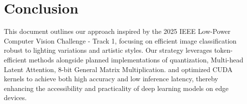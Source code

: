 \documentclass[11pt, oneside]{article}   	%
\begin{document}


\section*{Conclusion}

This document outlines our approach inspired by the 2025 IEEE Low-Power Computer Vision Challenge - Track 1, focusing on efficient image classification robust to lighting variations and artistic styles. Our strategy leverages token-efficient methods alongside planned implementations of quantization, Multi-head Latent Attention, 8-bit General Matrix Multiplication. and optimized CUDA kernels to achieve both high accuracy and low inference latency, thereby enhancing the accessibility and practicality of deep learning models on edge devices.




\printbibliography
\end{document}

